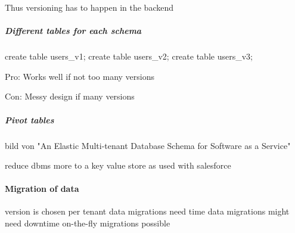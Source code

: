   Thus versioning has to happen in the backend

  \subparagraph{Different tables for each schema}
  create table users_v1;
  create table users_v2;
  create table users_v3;

  Pro:
  Works well if not too many versions

  Con:
  Messy design if many versions


  \subparagraph{Pivot tables}

  bild von "An Elastic Multi-tenant Database Schema for Software as a Service"

  reduce dbms more to a key value store
  as used with salesforce

\paragraph{Migration of data}
  version is chosen per tenant
  data migrations need time
  data migrations might need downtime
  on-the-fly migrations possible

